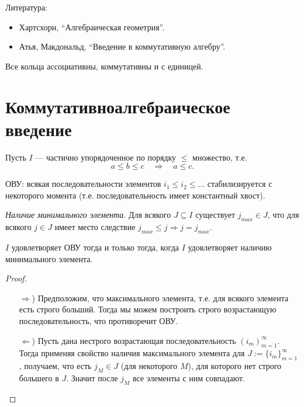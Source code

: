 \documentclass[12pt,a4paper]{article}
\date{}
\begin{document}
    \maketitle

    \listoftodos[TODOs]

    \tableofcontents

    \vspace{2em}
    Литература:
    \begin{itemize}
        \item Хартсхорн, ``Алгебраическая геометрия''.
        \item Атья, Макдональд, ``Введение в коммутативную алгебру''.
    \end{itemize}

    \begin{remark}
        Все кольца ассоциативны, коммутативны и с единицей.
    \end{remark}

    \section{Коммутативноалгебраическое введение}

    \begin{definition}
        Пусть $I$ --- частично упорядоченное по порядку $\leqslant$ множество, т.е.
        \[a \leqslant b \leqslant c \quad \Longrightarrow \quad a \leqslant c.\]

        ОВУ: всякая последовательности элементов $i_1 \leqslant i_2 \leqslant \dots$ стабилизируется с некоторого момента (т.е. последовательность имеет константный хвост).

        \emph{Наличие минимального элемента}. Для всякого $J \subseteq I$ существует $j_{max} \in J$, что для всякого $j \in J$ имеет место следствие $j_{max} \leqslant j \Rightarrow j = j_{max}$.
    \end{definition}

    \begin{lemma}
        $I$ удовлетворяет ОВУ тогда и только тогда, когда $I$ удовлетворяет наличию минимального элемента.
    \end{lemma}
    
    \begin{proof}
        \begin{itemize}
            \item[$\Rightarrow$)] Предположим, что максимального элемента, т.е. для всякого элемента есть строго больший. Тогда мы можем построить строго возрастающую последовательность, что противоречит ОВУ.
            \item[$\Leftarrow$)] Пусть дана нестрого возрастающая последовательность $(i_m)_{m=1}^\infty$. Тогда применяя свойство наличия максимального элемента для $J := \{i_m\}_{m=1}^\infty$, получаем, что есть $j_M \in J$ (для некоторого $M$), для которого нет строго большего в $J$. Значит после $j_M$ все элементы с ним совпадают. 
        \end{itemize}
    \end{proof}
\end{document}
